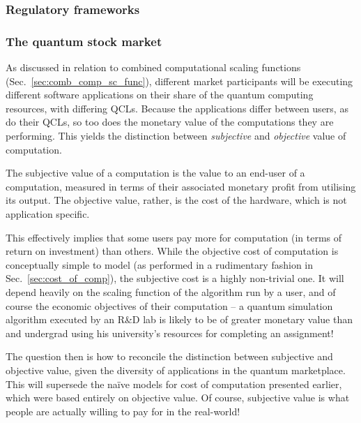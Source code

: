 \subsubsection{Regulatory frameworks} 


%
%

\subsubsection{The quantum stock market}

As discussed in relation to combined computational scaling functions (Sec.~\ref{sec:comb_comp_sc_func}), different market participants will be executing different software applications on their share of the quantum computing resources, with differing QCLs. Because the applications differ between users, as do their QCLs, so too does the monetary value of the computations they are performing. This yields the distinction between \textit{subjective} and \textit{objective} value of computation.

The subjective value of a computation is the value to an end-user of a computation, measured in terms of their associated monetary profit from utilising its output. The objective value, rather, is the cost of the hardware, which is not application specific.

This effectively implies that some users pay more for computation (in terms of return on investment) than others. While the objective cost of computation is conceptually simple to model (as performed in a rudimentary fashion in Sec.~\ref{sec:cost_of_comp}), the subjective cost is a highly non-trivial one. It will depend heavily on the scaling function of the algorithm run by a user, and of course the economic objectives of their computation -- a quantum simulation algorithm executed by an R\&D lab is likely to be of greater monetary value than and undergrad using his university's resources for completing an assignment!

The question then is how to reconcile the distinction between subjective and objective value, given the diversity of applications in the quantum marketplace. This will supersede the na\"ive models for cost of computation presented earlier, which were based entirely on objective value. Of course, subjective value is what people are actually willing to pay for in the real-world!


